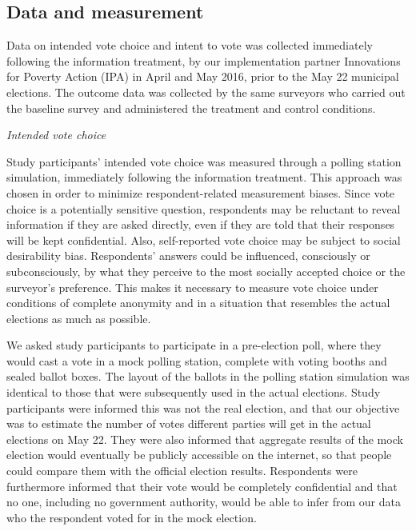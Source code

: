 \documentclass[11pt]{article}
\begin{document}
\subsection{Data and measurement}

Data on intended vote choice and intent to vote was collected immediately following the information treatment, by our implementation partner Innovations for Poverty Action (IPA) in April and May 2016, prior to the May 22 municipal elections. The outcome data was collected by the same surveyors who carried out the baseline survey and administered the treatment and control conditions. 


\emph{Intended vote choice}

Study participants' intended vote choice was measured through a polling station simulation, immediately following the information treatment. This approach was chosen in order to minimize respondent-related measurement biases. Since vote choice is a potentially sensitive question, respondents may be reluctant to reveal information if they are asked directly, even if they are told that their responses will be kept confidential. Also, self-reported vote choice may be subject to social desirability bias. Respondents' answers could be influenced, consciously or subconsciously, by what they perceive to the most socially accepted choice or the surveyor's preference. This makes it necessary to measure vote choice under conditions of complete anonymity and in a situation that resembles the actual elections as much as possible. 

We asked study participants to participate in a pre-election poll, where they would cast a vote in a mock polling station, complete with voting booths and sealed ballot boxes. The layout of the ballots in the polling station simulation was identical to those that were subsequently used in the actual elections. Study participants were informed this was not the real election, and that our objective was to estimate the number of votes different parties will get in the actual elections on May 22. They were also informed that aggregate results of the mock election would eventually be publicly accessible on the internet, so that people could compare them with the official election results. Respondents were furthermore informed that their vote would be completely confidential and that no one, including no government authority, would be able to infer from our data who the respondent voted for in the mock election. 
\end{document}

